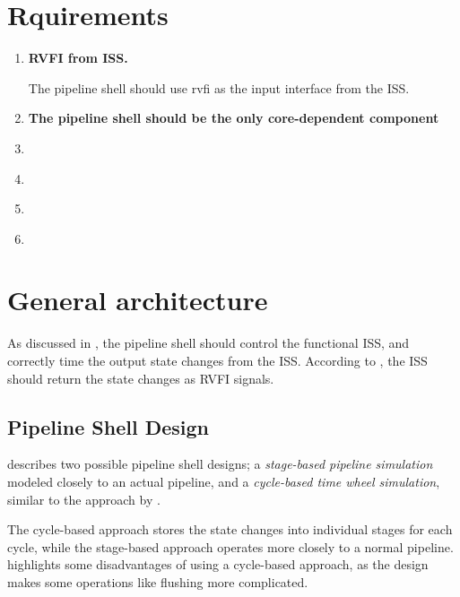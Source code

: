 \section{Rquirements}

\begin{enumerate}

\item \textbf{RVFI from ISS.} \label{psReq:rvfi}
\par The pipeline shell should use \acrshort{rvfi} as the input interface from the ISS.

\item \textbf{The pipeline shell should be the only core-dependent component} \label{psReq:}
\par 

\item \textbf{} \label{psReq:}
\par 
\item \textbf{} \label{psReq:}
\par 
\item \textbf{} \label{psReq:}
\par 
\item \textbf{} \label{psReq:}
\par 
\end{enumerate}

\section{General architecture}

As discussed in , the pipeline shell should control the functional ISS, and correctly time the output state changes from the ISS. According to , the ISS should return the state changes as RVFI signals.


\subsection{Pipeline Shell Design}

 describes two possible pipeline shell designs; a \textit{stage-based pipeline simulation} modeled closely to an actual pipeline, and a \textit{cycle-based time wheel simulation}, similar to the approach by \textcite{chiangEfficientTwolayeredCycleaccurate2009}. 

The cycle-based approach stores the state changes into individual stages for each cycle, while the stage-based approach operates more closely to a normal pipeline.
 highlights some disadvantages of using a cycle-based approach, as the design makes some operations like flushing more complicated. 

